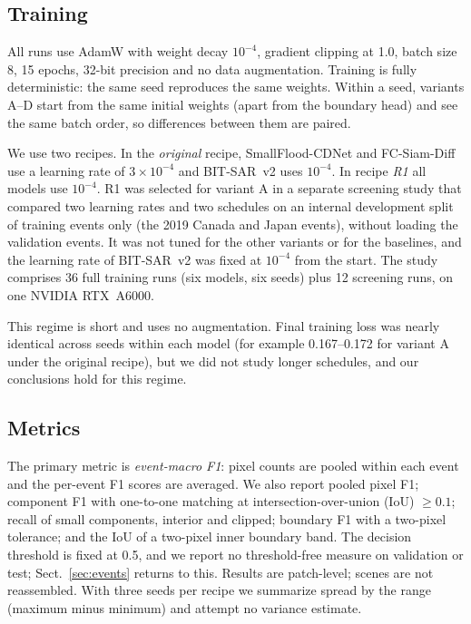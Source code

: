 \documentclass[runningheads]{llncs}
\begin{document}
\subsection{Training}
\label{sec:training}

All runs use AdamW with weight decay $10^{-4}$, gradient clipping at 1.0, batch size 8,
15 epochs, 32-bit precision and no data augmentation. Training is fully deterministic: the
same seed reproduces the same weights. Within a seed, variants A--D start from the same
initial weights (apart from the boundary head) and see the same batch order, so differences
between them are paired.

We use two recipes. In the \emph{original} recipe, SmallFlood-CDNet and FC-Siam-Diff use a
learning rate of $3\times 10^{-4}$ and BIT-SAR~v2 uses $10^{-4}$. In recipe \emph{R1} all
models use $10^{-4}$. R1 was selected for variant A in a separate screening study that
compared two learning rates and two schedules on an internal development split of training
events only (the 2019 Canada and Japan events), without loading the validation events. It
was not tuned for the other variants or for the baselines, and the learning rate of
BIT-SAR~v2 was fixed at $10^{-4}$ from the start. The study comprises 36 full training runs
(six models, six seeds) plus 12 screening runs, on one NVIDIA RTX~A6000.

This regime is short and uses no augmentation. Final training loss was nearly identical
across seeds within each model (for example 0.167--0.172 for variant A under the original
recipe), but we did not study longer schedules, and our conclusions hold for this regime.

\subsection{Metrics}

The primary metric is \emph{event-macro F1}: pixel counts are pooled within each event and
the per-event F1 scores are averaged. We also report pooled pixel F1; component F1 with
one-to-one matching at intersection-over-union (IoU) $\geq 0.1$; recall of small components,
interior and clipped; boundary F1 with a two-pixel tolerance; and the IoU of a two-pixel inner boundary band. The decision threshold is fixed at 0.5, and we
report no threshold-free measure on validation or test; Sect.~\ref{sec:events} returns to
this. Results are patch-level; scenes are not reassembled. With three seeds per recipe we
summarize spread by the range (maximum minus minimum) and attempt no variance estimate.
\end{document}
